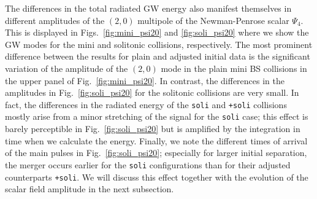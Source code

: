 \documentclass[]{iopart}
\newcommand{\us}[1]{\textcolor{teal}{[{\it\textbf{US: #1}}]} }
\renewcommand{\mr}[1]{\textcolor{purple}{[{\it\textbf{MR: #1}}]} }
\begin{document}
The differences in the total radiated GW energy also manifest themselves
in different amplitudes of the $(2,0)$ multipole of the Newman-Penrose
scalar $\Psi_4$. This is displayed in Figs.~\ref{fig:mini_psi20}
and \ref{fig:soli_psi20} where we show the GW modes for the mini and
solitonic collisions, respectively. The most prominent difference
between the results for plain and adjusted initial data is the
significant variation of the amplitude of the $(2,0)$ mode in the
plain mini BS collisions in the upper panel of Fig.~\ref{fig:mini_psi20}.
In contrast, the differences in the amplitudes in Fig.~\ref{fig:soli_psi20}
for the solitonic collisions are very small. In fact, the differences
in the radiated energy of the {\tt soli} and {\tt +soli} collisions mostly
arise from a minor stretching of the signal for the {\tt soli} case; this
effect is barely perceptible in Fig.~\ref{fig:soli_psi20} but is amplified
by the integration in time when we calculate the energy. Finally, we note
the different times of arrival of the main pulses in Fig.~\ref{fig:soli_psi20};
especially for larger initial separation, the merger occurs earlier for
the {\tt soli} configurations than for their adjusted counterparts
{\tt +soli}.
We will discuss this effect together with the evolution
of the scalar field amplitude in the next subsection.
\end{document}

